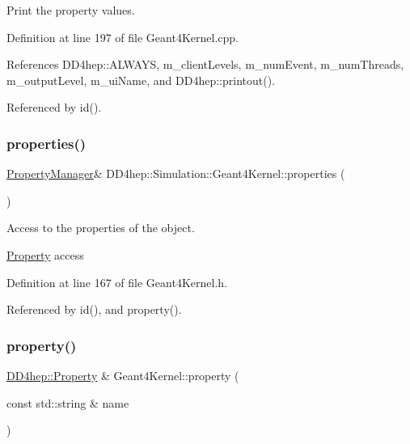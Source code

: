 Print the property values. 



Definition at line 197 of file Geant4\+Kernel.\+cpp.



References D\+D4hep\+::\+A\+L\+W\+A\+YS, m\+\_\+client\+Levels, m\+\_\+num\+Event, m\+\_\+num\+Threads, m\+\_\+output\+Level, m\+\_\+ui\+Name, and D\+D4hep\+::printout().



Referenced by id().

\hypertarget{class_d_d4hep_1_1_simulation_1_1_geant4_kernel_a39d0b3dcebed9c0ec950410df346710b}{}\label{class_d_d4hep_1_1_simulation_1_1_geant4_kernel_a39d0b3dcebed9c0ec950410df346710b} 
\subsubsection{\texorpdfstring{properties()}{properties()}}
{\footnotesize\ttfamily \hyperlink{class_d_d4hep_1_1_property_manager}{Property\+Manager}\& D\+D4hep\+::\+Simulation\+::\+Geant4\+Kernel\+::properties (\begin{DoxyParamCaption}{ }\end{DoxyParamCaption})\hspace{0.3cm}{\ttfamily [inline]}}



Access to the properties of the object. 

\hyperlink{class_d_d4hep_1_1_property}{Property} access 

Definition at line 167 of file Geant4\+Kernel.\+h.



Referenced by id(), and property().

\hypertarget{class_d_d4hep_1_1_simulation_1_1_geant4_kernel_a51c2d757b81b0c8ee31be77515d4d622}{}\label{class_d_d4hep_1_1_simulation_1_1_geant4_kernel_a51c2d757b81b0c8ee31be77515d4d622} 
\subsubsection{\texorpdfstring{property()}{property()}}
{\footnotesize\ttfamily \hyperlink{class_d_d4hep_1_1_property}{D\+D4hep\+::\+Property} \& Geant4\+Kernel\+::property (\begin{DoxyParamCaption}\item[{const std\+::string \&}]{name }\end{DoxyParamCaption})}



